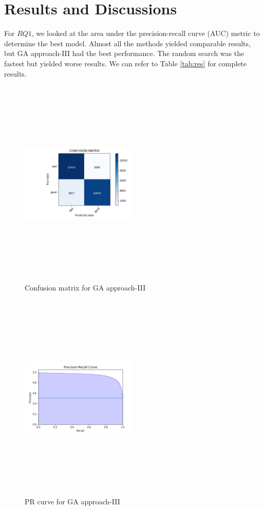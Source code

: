 \documentclass[conference]{IEEEtran}
\begin{document}
\section{Results and Discussions}
For $RQ1$, we looked at the area under the precision-recall curve (AUC) metric to determine the best model. Almost all the methods yielded comparable results, but GA approach-III had the best performance. The random search was the fastest but yielded worse results. We can refer to Table \ref{tab:res} for complete results.


\begin{figure}
\includegraphics[width=0.5\textwidth, height=10cm, keepaspectratio]{genetic-type-3/genetic-type-3-confusion-matrix.png}
\caption{Confusion matrix for GA approach-III}
 \label{fig:confusion}
\end{figure}
\begin{figure}
\includegraphics[width=0.5\textwidth, height=10cm, keepaspectratio]{genetic-type-3/Precision-Recall-Curve-genetic-type-3.png}
\caption{PR curve for GA approach-III}
\label{fig:prga}
\end{figure}
\end{document}
